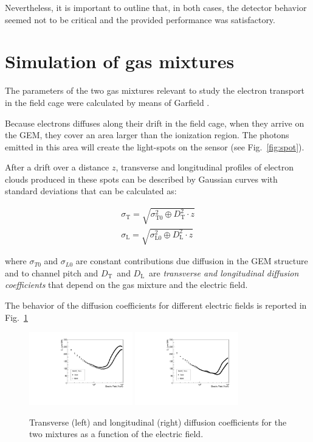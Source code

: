 \documentclass[a4paper,11pt]{article}
\newcommand{\Dt}  {$D_{\mathrm{T}}$}
\newcommand{\Dl}  {$D_{\mathrm{L}}$}
\begin{document}
Nevertheless, it is important to outline that, in both cases, the detector behavior seemed not to be critical and the provided performance was satisfactory. 

\section{Simulation of gas mixtures}

The parameters of the two gas mixtures relevant to study the electron transport in the field cage were calculated
by means of Garfield \cite{bib:garfield1,bib:garfield2}.

Because electrons diffuses along their drift in the field cage, when they arrive on the GEM,
they cover an area larger than the ionization region. The photons emitted in this area will create the light-spots on the sensor (see Fig.~\ref{fig:spot}).

After a drift over a distance $z$, transverse and longitudinal profiles of electron clouds produced in these spots can be described by Gaussian curves with standard deviations that can be calculated as:

\begin{eqnarray}
\label{eq:diff}
\sigma_{\mathrm{T}} = \sqrt{\sigma^2_{\mathrm{T0}} \oplus D^2_{\mathrm{T}} \cdot z} \\
\sigma_{\mathrm{L}} = \sqrt{\sigma^2_{\mathrm{L0}} \oplus D^2_{\mathrm{L}} \cdot z}
\end{eqnarray}

where $\sigma_{T0}$ and $\sigma_{L0}$ are constant contributions due diffusion in the GEM structure and to channel pitch and \Dt\ and \Dl\ are {\it transverse and longitudinal diffusion coefficients} that depend on the gas mixture and the electric field.

The behavior of the diffusion coefficients for different electric fields is reported in Fig.~\ref{fig:diff}

\begin{figure}[ht]
\centering
\includegraphics[width=0.4\textwidth]{Figures/gDT_renga.pdf}
\includegraphics[width=0.4\textwidth]{Figures/gDL_renga.pdf}
\caption{Transverse (left) and longitudinal (right) diffusion coefficients for the two mixtures as a function of the electric field.}
\label{fig:diff}
\end{figure}
\end{document}
